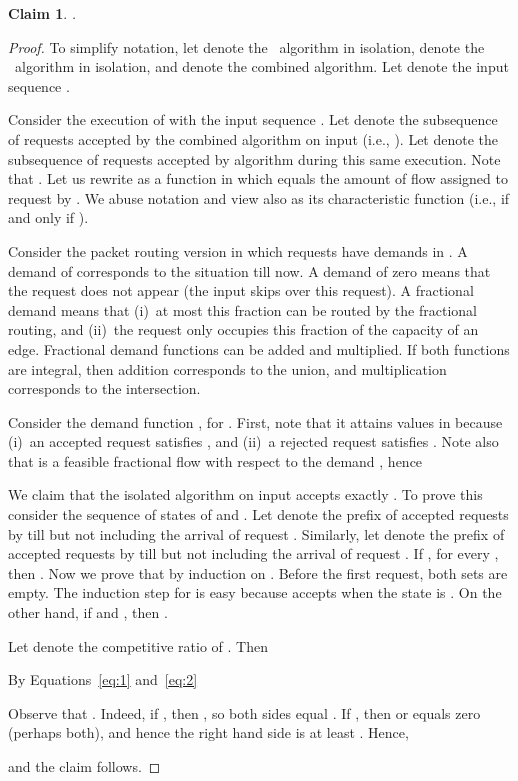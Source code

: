 \documentclass[11pt]{article}
\newtheorem{claim}[theorem]{Claim}
\newcommand{\route}{\text{\sc{ipp}}\xspace}
\newcommand{\IPP}{\route}
\newcommand{\initroute}{\text{\sc{initial-route}}\xspace}
\newenvironment{proof sketch}[1]{\noindent {\emph{Proof sketch of #1:}}}{\hfill \qed}
\begin{document}
\begin{claim}\label{claim:combine}
  .
\end{claim}
\begin{proof}
  To simplify notation, let  denote the \IPP\ algorithm in isolation, 
  denote the \initroute\ algorithm in isolation, and  denote the combined
  algorithm. Let  denote the input sequence .

  Consider the execution of  with the input sequence .  Let  denote the
  subsequence of requests accepted by the combined algorithm  on input  (i.e.,
  ).  Let  denote the subsequence of requests accepted by algorithm
   during this same execution. Note that .  Let us rewrite
   as a function  in which  equals
  the amount of flow assigned to request  by . We abuse
  notation and view  also as its characteristic function (i.e.,  if and
  only if ).

  Consider the packet routing version in which requests have demands in . A
  demand of  corresponds to the situation till now. A demand of zero means that
  the request does not appear (the input skips over this request). A fractional
  demand means that (i)~at most this fraction can be routed by the fractional
  routing, and (ii)~the request only occupies this fraction of the capacity of an
  edge. Fractional demand functions can be added and multiplied. If both
  functions are integral, then addition corresponds to the union, and
  multiplication corresponds to the intersection.

  Consider the demand function , for
  . First, note that it attains values in  because (i)~an
  accepted request  satisfies , and (ii)~a rejected request
   satisfies .  Note also that  is a
  feasible fractional flow with respect to the demand , hence
   

   We claim that the isolated algorithm  on input  accepts
   exactly .  To prove this consider the sequence of states of
    and . Let  denote the prefix of accepted
   requests by  till but not including the arrival of request
   .  Similarly, let  denote the prefix of accepted requests by  till
   but not including the arrival of request . If , for every , then
   . Now we prove that  by induction on . Before
   the first request, both sets are empty. The induction step for  is easy
   because  accepts  when the state is . On the other hand, if
    and , then .

Let  denote the competitive ratio of . Then


By Equations~\ref{eq:1} and~\ref{eq:2}

Observe that . Indeed, if , then
, so both sides equal . If , then  or 
equals zero (perhaps both), and hence the right hand side is at least .
Hence,

and the claim follows.
\end{proof}
\end{document}
